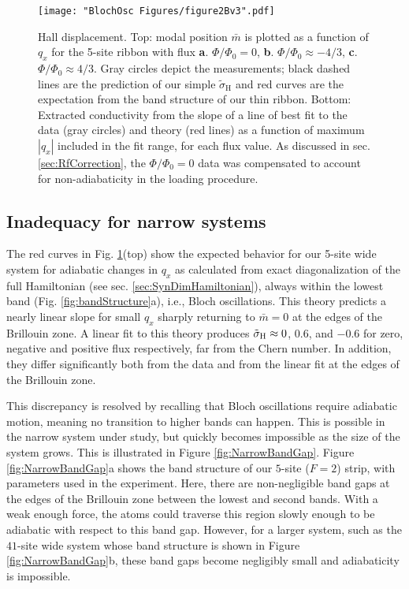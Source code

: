 \begin{figure}
\texttt{[image: "BlochOsc Figures/figure2Bv3".pdf]}
\caption[Hall displacement]{Hall displacement. Top: modal position $\bar{m}$ is plotted as a function of $q_x$ for the 5-site ribbon with flux \textbf{a}. $\Phi/\Phi_0=0$, \textbf{b}. $\Phi/\Phi_0\approx-4/3$, \textbf{c}. $\Phi/\Phi_0\approx4/3$. Gray circles depict the measurements; black dashed lines are the prediction of our simple $\tilde{\sigma}_\textrm{H}$ and red curves are the expectation from the band structure of our thin ribbon. Bottom: Extracted conductivity from the slope of a line of best fit to the data (gray circles) and theory (red lines) as a function of maximum $|q_x|$ included in the fit range, for each flux value. As discussed in sec. \ref{sec:RfCorrection}, the $\Phi/\Phi_0=0$ data was compensated to account for non-adiabaticity in the loading procedure. }
\label{fig:magnetization}
\end{figure}


\subsection{Inadequacy for narrow systems}
The red curves in Fig. \ref{fig:magnetization}(top) show the expected behavior for our 5-site wide system for adiabatic changes in $q_x$ as calculated from exact diagonalization of the full Hamiltonian (see sec. \ref{sec:SynDimHamiltonian}), always within the lowest band (Fig. \ref{fig:bandStructure}a), i.e., Bloch oscillations.  This theory predicts a nearly linear slope for small $q_x$ sharply returning to $\bar{m}=0$ at the edges of the Brillouin zone. A linear fit to this theory produces $\tilde{\sigma}_{\rm{H}}\approx0$, $0.6$, and $-0.6$ for zero, negative and positive flux respectively, far from the Chern number. In addition, they differ significantly both from the data and from the linear fit at the edges of the Brillouin zone.

This discrepancy is resolved by recalling that Bloch oscillations require adiabatic motion, meaning no transition to higher bands can happen. This is possible in the narrow system under study, but quickly becomes impossible as the size of the system grows. This is illustrated in Figure \ref{fig:NarrowBandGap}.  Figure \ref{fig:NarrowBandGap}a shows the band structure of our $5$-site ($F=2$) strip, with parameters used in the experiment. Here, there are non-negligible band gaps at the edges of the Brillouin zone between the lowest and second bands. With a weak enough force, the atoms could traverse this region slowly enough to be adiabatic with respect to this band gap. However, for a larger system, such as the $41$-site wide system whose band structure is shown in  Figure \ref{fig:NarrowBandGap}b, these band gaps become negligibly small and adiabaticity is impossible. 

